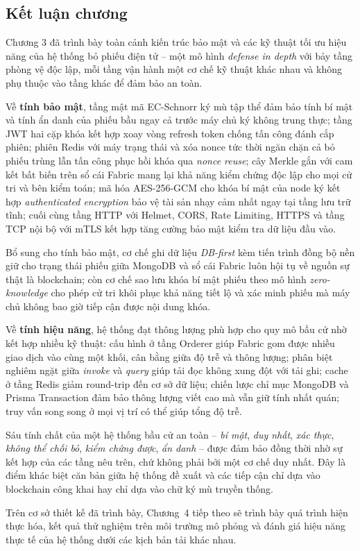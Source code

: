 \subsection{Kết luận chương}

Chương 3 đã trình bày toàn cảnh kiến trúc bảo mật và các kỹ thuật tối ưu hiệu năng của hệ thống bỏ phiếu điện tử -- một mô hình \textit{defense in depth} với bảy tầng phòng vệ độc lập, mỗi tầng vận hành một cơ chế kỹ thuật khác nhau và không phụ thuộc vào tầng khác để đảm bảo an toàn.

Về \textbf{tính bảo mật}, tầng mật mã EC-Schnorr ký mù tập thể đảm bảo tính bí mật và tính ẩn danh của phiếu bầu ngay cả trước máy chủ ký không trung thực; tầng JWT hai cặp khóa kết hợp xoay vòng refresh token chống tấn công đánh cắp phiên; phiên Redis với máy trạng thái và xóa nonce tức thời ngăn chặn cả bỏ phiếu trùng lẫn tấn công phục hồi khóa qua \textit{nonce reuse}; cây Merkle gắn với cam kết bất biến trên sổ cái Fabric mang lại khả năng kiểm chứng độc lập cho mọi cử tri và bên kiểm toán; mã hóa AES-256-GCM cho khóa bí mật của node ký kết hợp \textit{authenticated encryption} bảo vệ tài sản nhạy cảm nhất ngay tại tầng lưu trữ tĩnh; cuối cùng tầng HTTP với Helmet, CORS, Rate Limiting, HTTPS và tầng TCP nội bộ với mTLS kết hợp  tăng cường bảo mật kiểm tra dữ liệu đầu vào.

Bổ sung cho tính bảo mật, cơ chế ghi dữ liệu \textit{DB-first} kèm tiến trình đồng bộ nền giữ cho trạng thái phiếu giữa MongoDB và sổ cái Fabric luôn hội tụ về nguồn sự thật là blockchain; còn cơ chế sao lưu khóa bí mật phiếu theo mô hình \textit{zero-knowledge} cho phép cử tri khôi phục khả năng tiết lộ và xác minh phiếu mà máy chủ không bao giờ tiếp cận được nội dung khóa.

Về \textbf{tính hiệu năng}, hệ thống đạt thông lượng phù hợp cho quy mô bầu cử nhờ kết hợp nhiều kỹ thuật: cấu hình  ở tầng Orderer giúp Fabric gom được nhiều giao dịch vào cùng một khối, cân bằng giữa độ trễ và thông lượng; phân biệt nghiêm ngặt giữa \textit{invoke} và \textit{query} giúp tải đọc không xung đột với tải ghi; cache ở tầng Redis giảm round-trip đến cơ sở dữ liệu; chiến lược chỉ mục MongoDB và Prisma Transaction đảm bảo thông lượng viết cao mà vẫn giữ tính nhất quán; truy vấn song song ở mọi vị trí có thể giúp tổng độ trễ.

Sáu tính chất của một hệ thống bầu cử an toàn -- \textit{bí mật}, \textit{duy nhất}, \textit{xác thực}, \textit{không thể chối bỏ}, \textit{kiểm chứng được}, \textit{ẩn danh} -- được đảm bảo đồng thời nhờ sự kết hợp của các tầng nêu trên, chứ không phải bởi một cơ chế duy nhất. Đây là điểm khác biệt căn bản giữa hệ thống đề xuất và các tiếp cận chỉ dựa vào blockchain công khai hay chỉ dựa vào chữ ký mù truyền thống.

Trên cơ sở thiết kế đã trình bày, Chương~4 tiếp theo sẽ trình bày quá trình hiện thực hóa, kết quả thử nghiệm trên môi trường mô phỏng và đánh giá hiệu năng thực tế của hệ thống dưới các kịch bản tải khác nhau.
